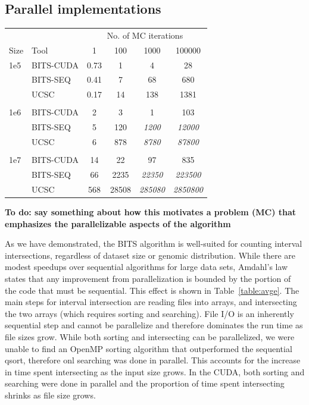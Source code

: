 \documentclass{bioinfo}
\begin{document}
\subsection{Parallel implementations}

\begin{center}
	\begin{tabular}{l l c c c c}
	\multicolumn{2}{c}{} & \multicolumn{4}{c}{No. of MC iterations} \\
	\cline{3-6}
	Size & Tool & 1 & 100 & 1000 & 100000 \\
	\hline
	\hline
	1e5 & BITS-CUDA & 0.73 & 1  & 4   & 28 \\
		& BITS-SEQ  & 0.41 & 7  & 68  & 680 \\
		& UCSC      & 0.17 & 14 & 138 & 1381 \\
	\\
	1e6 & BITS-CUDA & 2 & 3    & 1       & 103 \\
		& BITS-SEQ  & 5 & 120  & \emph{1200} & \emph{12000} \\
		& UCSC      & 6 & 878  & \emph{8780} & \emph{87800} \\
	\\
	1e7 & BITS-CUDA & 14  & 22    & 97            & 835 \\
		& BITS-SEQ  & 66  & 2235  & \emph{22350}  & \emph{223500} \\
		& UCSC      & 568 & 28508 & \emph{285080} & \emph{2850800} \\
	
	\hline
	\end{tabular}
\end{center}
\label{table:avge}

		
\textbf{To do: say something about how this motivates a problem (MC)
that emphasizes the parallelizable aspects of the algorithm}

As we have demonstrated, the BITS algorithm is well-suited for counting interval
intersections, regardless of dataset size or genomic distribution.  While there
are modest speedups over sequential algorithms for large data sets, Amdahl's
law~\citep{amdahl1967} states that any improvement from parallelization is
bounded by  the portion of the code that must be sequential.  This effect is
shown in Table~\ref{table:avge}.  The main steps for interval intersection are
reading files into arrays, and intersecting the two arrays (which requires
sorting and searching).  File I/O is an inherently sequential step and cannot be
parallelize and therefore dominates the run time as file sizes grow.  While both
sorting and intersecting can be parallelized, we were unable to find an OpenMP
sorting algorithm that outperformed the sequential qsort, therefore onl
searching was done in parallel.  This accounts for the increase in time spent
intersecting as the input size grows.  In the CUDA, both sorting and searching
were done in parallel and the proportion of time spent intersecting shrinks as
file size grows.
        
\end{document}
